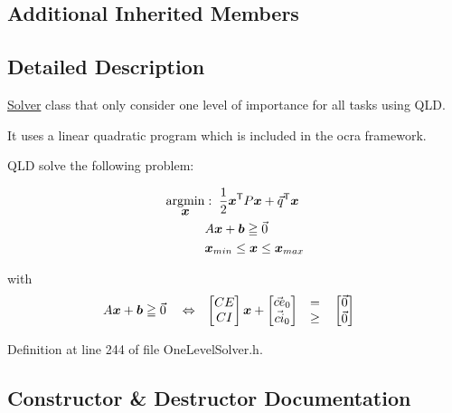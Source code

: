 \subsection*{Additional Inherited Members}


\subsection{Detailed Description}
\hyperlink{classocra_1_1Solver}{Solver} class that only consider one level of importance for all tasks using Q\+LD. 

It uses a linear quadratic program which is included in the ocra framework.

Q\+LD solve the following problem\+:

\begin{align*} \underset{\mbox{\boldmath${x}$}}{\operatorname{argmin}} &: \; \frac{1}{2} \mbox{\boldmath${x}$}^{\mathsf{T}} P \mbox{\boldmath${x}$} + \vec{q}^{\mathsf{T}} \mbox{\boldmath${x}$} \\ & A \mbox{\boldmath${x}$} + \mbox{\boldmath${b}$} \geqq \vec{0} \\ & \mbox{\boldmath${x}$}_{min} \leq \mbox{\boldmath${x}$} \leq \mbox{\boldmath${x}$}_{max} \end{align*}

with \begin{align*} A \mbox{\boldmath${x}$} + \mbox{\boldmath${b}$} &\geqq \vec{0} & &\Leftrightarrow &\begin{bmatrix} CE \\ CI \end{bmatrix} \mbox{\boldmath${x}$} + \begin{bmatrix} \vec{ce}_0 \\ \vec{ci}_0 \end{bmatrix} & \quad \begin{matrix} = \\ \geq \end{matrix} \quad \begin{bmatrix} \vec{0} \\ \vec{0} \end{bmatrix} \end{align*} 

Definition at line 244 of file One\+Level\+Solver.\+h.



\subsection{Constructor \& Destructor Documentation}
\hypertarget{classocra_1_1OneLevelSolverWithQLD_a75cf75293c527be3cbafb379bcddd758}{}\label{classocra_1_1OneLevelSolverWithQLD_a75cf75293c527be3cbafb379bcddd758} 
